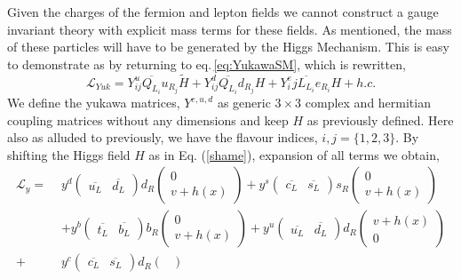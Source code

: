 Given the charges of the fermion and lepton fields we cannot construct a gauge invariant theory with explicit mass terms for these fields. As mentioned, the mass of these particles will have to be generated by the Higgs Mechanism. This is easy to demonstrate as by returning to eq.\,\ref{eq:YukawaSM}, which is rewritten, 
\begin{equation}
\label{eq:YukawaSM2}
\mathcal{L}_{Yuk} = Y^u_{ij} \overline{Q_{L_i}} u_{R_j}  \tilde{H} + Y^d_{ij} \overline{Q_{L_i}}  d_{R_j} H  + Y^e_ij \overline{L_{L_i}}  e_{R_i} H + h.c. 
\end{equation}
%
We define the yukawa matrices, $Y^{e,u,d}$ as generic $3\times3$ complex and hermitian coupling matrices without any dimensions and keep $H$ as previously defined. Here also as alluded to previously, we have the flavour indices, $i,j=\{ 1,2,3 \}$. By shifting the Higgs field $H$ as in Eq. (\ref{shame}), { \color{gray} expansion of all  terms we obtain, 
%
\begin{align}
\mathcal{L}_y = \, \, & y^d 
\begin{pmatrix}
\overline{u_L} & \overline{d_L} 
\end{pmatrix} d_R 
\begin{pmatrix}
0\\ v + h(x)
\end{pmatrix}  + 
y^s 
\begin{pmatrix}
\overline{c_L} & \overline{s_L} 
\end{pmatrix} s_R 
\begin{pmatrix}
0 \\ v + h(x)
\end{pmatrix} \nonumber  \\ & +
 y^b 
\begin{pmatrix}
\overline{t_L} & \overline{b_L} 
\end{pmatrix} b_R 
\begin{pmatrix}
0 \\ v + h(x)
\end{pmatrix}  +
 y^u 
\begin{pmatrix}
\overline{u_L} & \overline{d_L} 
\end{pmatrix} d_R 
\begin{pmatrix}
v + h(x) \\ 0
\end{pmatrix} \nonumber \\ + &   y^c 
\begin{pmatrix}
\overline{c_L} & \overline{s_L} 
\end{pmatrix} d_R 
\begin{pmatrix}

\end{pmatrix}
\end{align}}
